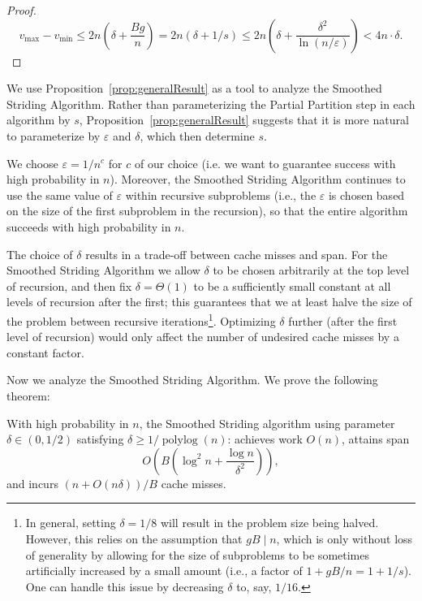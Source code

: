 \documentclass[a4paper,UKenglish,cleveref, autoref, thm-restate]{lipics-v2019}
\renewcommand{\epsilon}{\varepsilon}
\DeclareMathOperator{\polylog}{\text{polylog}}
\begin{document}
\begin{proof}
$$v_{\text{max}} - v_{\text{min}} \le 2n \left( \delta +
\frac{Bg}{n} \right)  = 2n \left( \delta + 1/s \right) \le
2n \left(\delta + \frac{\delta^2}{\ln (n / \epsilon)}\right) <
4n\cdot\delta.$$

\end{proof}

We use Proposition~\ref{prop:generalResult} as a tool to analyze
the Smoothed Striding Algorithm.
Rather than parameterizing the Partial Partition step in each
algorithm by $s$, Proposition~\ref{prop:generalResult} suggests
that it is more natural to parameterize by $\epsilon$ and
$\delta$, which then determine $s$.

We choose $\epsilon = 1/n^c$ for $c$ of our choice (i.e. we want
to guarantee success with high probability in $n$). Moreover, the
 Smoothed Striding Algorithm continues to use the same
value of $\epsilon$ within recursive subproblems (i.e., the
$\epsilon$ is chosen based on the size of the first subproblem in
the recursion), so that the entire algorithm succeeds with high
probability in $n$.

The choice of $\delta$ results in a trade-off between cache
misses and span. For the Smoothed Striding Algorithm we
allow $\delta$ to be chosen arbitrarily at the top level of
recursion, and then fix $\delta  = \Theta(1)$ to be a
sufficiently small constant at all levels of recursion after the
first; this guarantees that we at least halve the size of the
problem between recursive iterations\footnote{In general, setting
  $\delta = 1/8$ will result in the problem size being halved.
  However, this relies on the assumption that $gB \mid n$, which
  is only without loss of generality by allowing for the size of
subproblems to be sometimes artificially increased by a small
amount (i.e., a factor of $1 + gB / n = 1 + 1/s$). One can handle
this issue by decreasing $\delta$ to, say, $1/16$.}. Optimizing
$\delta$ further (after the first level of recursion) would only
affect the number of undesired cache misses by a constant factor.

Now we analyze the Smoothed Striding Algorithm. We
prove the following theorem:
\begin{theorem}
  \label{thm:groupedPartitionAlg}
  With high probability in $n$, the Smoothed Striding
  algorithm using parameter $\delta \in(0,1/2)$ satisfying
  $\delta \ge 1 / \polylog(n)$: achieves work $O(n)$, attains
  span $$O\left(B\left(\log^2 n + \frac{\log
  n}{\delta^2}\right)\right),$$ and incurs $(n+O(n \delta))/B$
  cache misses. 
\end{theorem}
\end{document}
